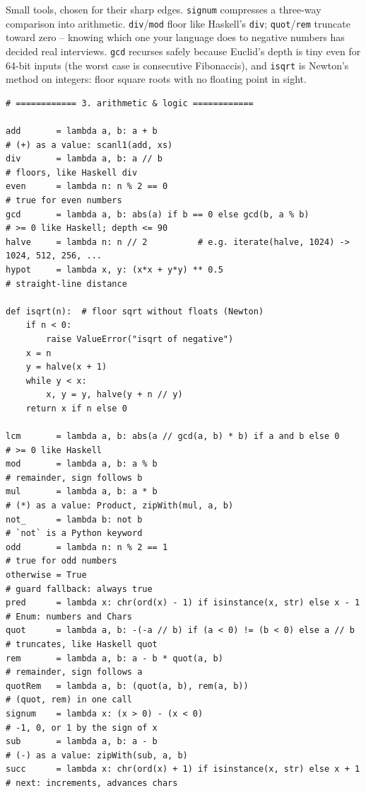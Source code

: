 \documentclass[11pt,letterpaper]{book}
\begin{document}
Small tools, chosen for their sharp edges. \texttt{signum} compresses a
three-way comparison into arithmetic. \texttt{div}/\texttt{mod} floor like
Haskell's \texttt{div}; \texttt{quot}/\texttt{rem} truncate toward zero --
knowing which one your language does to negative numbers has decided real
interviews. \texttt{gcd} recurses safely because Euclid's depth is tiny even
for 64-bit inputs (the worst case is consecutive Fibonaccis), and
\texttt{isqrt} is Newton's method on integers: floor square roots with no
floating point in sight.
\begin{lstlisting}[style=code]
# ============ 3. arithmetic & logic ============

add       = lambda a, b: a + b                                           # (+) as a value: scanl1(add, xs)
div       = lambda a, b: a // b                                          # floors, like Haskell div
even      = lambda n: n % 2 == 0                                         # true for even numbers
gcd       = lambda a, b: abs(a) if b == 0 else gcd(b, a % b)             # >= 0 like Haskell; depth <= 90
halve     = lambda n: n // 2          # e.g. iterate(halve, 1024) -> 1024, 512, 256, ...
hypot     = lambda x, y: (x*x + y*y) ** 0.5                              # straight-line distance

def isqrt(n):  # floor sqrt without floats (Newton)
    if n < 0:
        raise ValueError("isqrt of negative")
    x = n
    y = halve(x + 1)
    while y < x:
        x, y = y, halve(y + n // y)
    return x if n else 0

lcm       = lambda a, b: abs(a // gcd(a, b) * b) if a and b else 0       # >= 0 like Haskell
mod       = lambda a, b: a % b                                           # remainder, sign follows b
mul       = lambda a, b: a * b                                           # (*) as a value: Product, zipWith(mul, a, b)
not_      = lambda b: not b                                              # `not` is a Python keyword
odd       = lambda n: n % 2 == 1                                         # true for odd numbers
otherwise = True                                                        # guard fallback: always true
pred      = lambda x: chr(ord(x) - 1) if isinstance(x, str) else x - 1   # Enum: numbers and Chars
quot      = lambda a, b: -(-a // b) if (a < 0) != (b < 0) else a // b    # truncates, like Haskell quot
rem       = lambda a, b: a - b * quot(a, b)                              # remainder, sign follows a
quotRem   = lambda a, b: (quot(a, b), rem(a, b))                         # (quot, rem) in one call
signum    = lambda x: (x > 0) - (x < 0)                                  # -1, 0, or 1 by the sign of x
sub       = lambda a, b: a - b                                           # (-) as a value: zipWith(sub, a, b)
succ      = lambda x: chr(ord(x) + 1) if isinstance(x, str) else x + 1   # next: increments, advances chars
\end{lstlisting}
\end{document}
